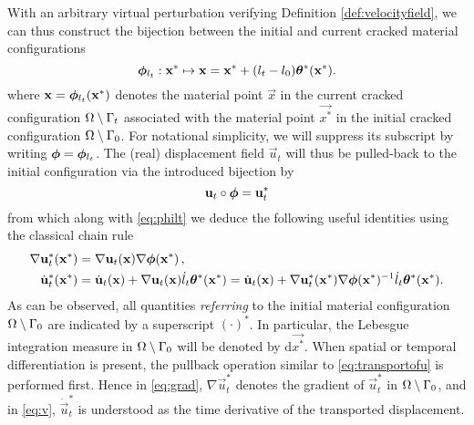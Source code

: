 With an arbitrary virtual perturbation verifying Definition \ref{def:velocityfield}, we can thus construct the bijection between the initial and current cracked material configurations
\begin{equation} \label{eq:philt}
\philt_{l_t}:\vec{x}^*\mapsto\vec{x}=\vec{x}^*+(l_t-l_0)\vtheta^*(\vec{x}^*).
\end{equation}
where $\vec{x}=\philt_{l_t}(\vec{x}^*)$ denotes the material point $\vec{x}$ in the current cracked configuration ${\Omega\setminus\Gamma_t}$ associated with the material point $\vec{x^*}$ in the initial cracked configuration ${\Omega\setminus\Gamma_0}$. For notational simplicity, we will suppress its subscript by writing $\philt=\philt_{l_t}$. The (real) displacement field $\vec{u}_t$ will thus be pulled-back to the initial configuration via the introduced bijection by
\begin{equation} \label{eq:transportofu}
\vec{u}_t\circ\philt=\vec{u}_t^*
\end{equation}
from which along with \eqref{eq:philt} we deduce the following useful identities using the classical chain rule
\begin{align}
\nabla\vec{u}_t^*(\vec{x}^*) &= \nabla\vec{u}_t(\vec{x})\nabla\philt(\vec{x}^*)\,, \label{eq:grad} \\
\dot{\vec{u}}_t^*(\vec{x}^*) &= \dot{\vec{u}}_t(\vec{x})+\nabla\vec{u}_t(\vec{x})\dot{l}_t\vtheta^*(\vec{x}^*)=\dot{\vec{u}}_t(\vec{x})+\nabla\vec{u}_t^*(\vec{x}^*)\nabla\philt(\vec{x}^*)^{-1}\dot{l}_t\vtheta^*(\vec{x}^*). \label{eq:v}
\end{align}
As can be observed, all quantities \emph{referring} to the initial material configuration ${\Omega\setminus\Gamma_0}$ are indicated by a superscript $(\cdot)^*$. In particular, the Lebesgue integration measure in ${\Omega\setminus\Gamma_0}$ will be denoted by $\mathrm{d}\vec{x^*}$. When spatial or temporal differentiation is present, the pullback operation similar to \eqref{eq:transportofu} is performed first. Hence in \eqref{eq:grad}, $\nabla\vec{u}_t^*$ denotes the gradient of $\vec{u}_t^*$ in ${\Omega\setminus\Gamma_0}$, and in \eqref{eq:v}, $\dot{\vec{u}}_t^*$ is understood as the time derivative of the transported displacement.

